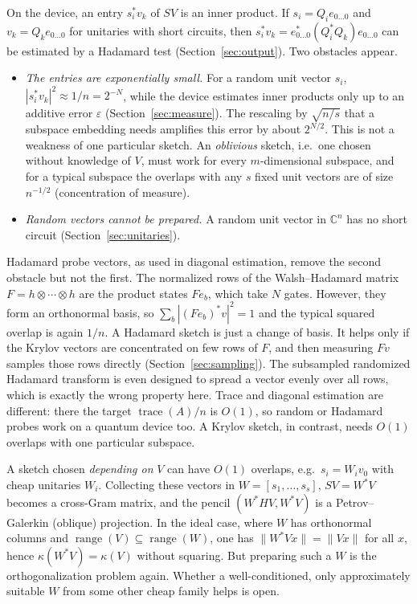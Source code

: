 \documentclass[11pt,a4paper]{article}
\newcommand{\C}{\mathbb{C}}
\begin{document}
On the device, an entry $s_i^*v_k$ of $SV$ is an inner product. If
$s_i=Q_ie_{0\dots0}$ and $v_k=Q_ke_{0\dots0}$ for unitaries with short circuits, then
$s_i^*v_k=e_{0\dots0}^*(Q_i^*Q_k)e_{0\dots0}$ can be estimated by a Hadamard test
(Section~\ref{sec:output}). Two obstacles appear.
\begin{itemize}
\item \emph{The entries are exponentially small.} For a random unit vector
  $s_i$, $|s_i^*v_k|^2\approx1/n=2^{-N}$, while the device estimates inner
  products only up to an additive error $\varepsilon$
  (Section~\ref{sec:measure}). The rescaling by $\sqrt{n/s}$ that a
  subspace embedding needs amplifies this error by about $2^{N/2}$. This
  is not a weakness of one particular sketch. An \emph{oblivious} sketch,
  i.e.\ one chosen without knowledge of $V$, must work for every
  $m$-dimensional subspace, and for a typical subspace the overlaps with
  any $s$ fixed unit vectors are of size $n^{-1/2}$ (concentration of
  measure).
\item \emph{Random vectors cannot be prepared.} A random unit vector in
  $\C^n$ has no short circuit (Section~\ref{sec:unitaries}).
\end{itemize}
Hadamard probe vectors, as used in diagonal estimation, remove the
second obstacle but not the first. The normalized rows of the
Walsh--Hadamard matrix $F=h\otimes\cdots\otimes h$ are the product states
$Fe_b$, which take $N$ gates. However, they form an orthonormal basis, so
$\sum_b|(Fe_b)^*v|^2=1$ and the typical squared overlap is again $1/n$. A
Hadamard sketch is just a change of basis. It helps only if the Krylov
vectors are concentrated on few rows of $F$, and then measuring $Fv$
samples those rows directly (Section~\ref{sec:sampling}). The subsampled
randomized Hadamard transform is even designed to spread a vector evenly
over all rows, which is exactly the wrong property here. Trace and
diagonal estimation are different: there the target
$\operatorname{trace}(A)/n$ is $O(1)$, so random or Hadamard probes work on a
quantum device too. A Krylov sketch, in contrast, needs $O(1)$ overlaps
with one particular subspace.

A sketch chosen \emph{depending on} $V$ can have $O(1)$ overlaps, e.g.\
$s_i=W_iv_0$ with cheap unitaries $W_i$. Collecting these vectors in
$W=[s_1,\dots,s_s]$, $SV=W^*V$ becomes a cross-Gram matrix, and the pencil
$(W^*HV,W^*V)$ is a Petrov--Galerkin (oblique) projection. In the ideal
case, where $W$ has orthonormal columns and
$\operatorname{range}(V)\subseteq\operatorname{range}(W)$, one has $\|W^*Vx\|=\|Vx\|$ for
all $x$, hence $\kappa(W^*V)=\kappa(V)$ without squaring. But preparing such a
$W$ is the orthogonalization problem again. Whether a well-conditioned,
only approximately suitable $W$ from some other cheap family helps is
open.
\end{document}
